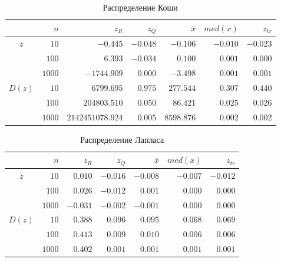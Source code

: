 \documentclass[zuev_report2.tex]{subfiles}
\begin{document}
\begin{table}[H]
\centering
\caption{Распределение Коши}
\begin{tabular}{c*6r}
\toprule
{} &         
$n$  & 
\centering $z_R$ & 
\centering $z_Q$ &
\centering $\overline{x}$& 
\centering $med(x)$ &
\centering $z_{tr}$ \tabularnewline
\midrule
\multirow{3}{*}{$\overline{z}$}
& $10$    & $-0.445$     & $-0.048$  & $-0.106$  & $-0.010$  & $-0.023$ \\
& $100$   & $ 6.393$     & $-0.034$  & $ 0.100$  & $ 0.001$  & $ 0.000$ \\
& $1000$  & $-1744.909$  & $ 0.000$  & $-3.498$  & $ 0.001$  & $ 0.001$ \\
\midrule
\multirow{3}{*}{$D(z)$}
& $10$    & $6799.695$        & $0.975$  & $277.544$   & $0.307$  & $0.440$ \\
& $100$   & $204803.510$      & $0.050$  & $86.421$    & $0.025$  & $0.026$ \\
& $1000$  & $2142451078.924$  & $0.005$  & $8598.876$  & $0.002$  & $0.002$ \\
\bottomrule
\end{tabular}
\label{table:cauchy}
\end{table}

\begin{table}[H]
\centering
\caption{Распределение Лапласа}
\begin{tabular}{c*6r}
\toprule
{} &         
$n$ & 
\centering $z_R$ & 
\centering $z_Q$ &
\centering $\overline{x}$& 
\centering $med(x)$ &
\centering $z_{tr}$ \tabularnewline
\midrule
\multirow{3}{*}{$\overline{z}$}
& $10$    & $ 0.010$  & $-0.016$  & $-0.008$  & $-0.007$  & $-0.012$ \\
& $100$   & $ 0.026$  & $-0.012$  & $ 0.001$  & $ 0.000$  & $ 0.000$ \\
& $1000$  & $-0.031$  & $-0.002$  & $-0.001$  & $ 0.000$  & $ 0.000$ \\
\midrule
\multirow{3}{*}{$D(z)$}
& $10$    & $0.388$  & $0.096$  & $0.095$  & $0.068$  & $0.069$ \\
& $100$   & $0.413$  & $0.009$  & $0.010$  & $0.006$  & $0.006$ \\
& $1000$  & $0.402$  & $0.001$  & $0.001$  & $0.001$  & $0.001$ \\
\bottomrule
\end{tabular}
\label{table:laplace}
\end{table}
\end{document}
